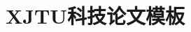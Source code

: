 \documentclass[UTF8,AutoFakeBold,twoside,fontset=Windows]{XJTUMCM}
\title{XJTU科技论文模板}
\begin{document}

\nocite{*}  %
\maketitle



\newpage

                                                              
\end{document}
